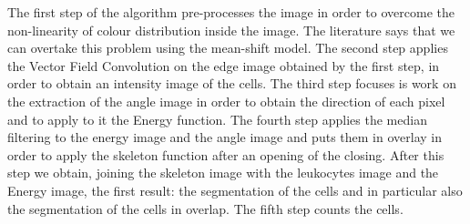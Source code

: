 The first step of the algorithm pre-processes the image in order to overcome the non-linearity  of colour distribution inside the image. The literature says that we can overtake this problem using the mean-shift model. The second step applies the Vector Field Convolution on the edge image obtained by the first step, in order to obtain an intensity image of the cells. The third step focuses is work on the extraction of the angle image in order to obtain the direction of each pixel and to apply to it the Energy function. The fourth step applies the median filtering to the energy image and the angle image and puts them in overlay in order to apply the skeleton function after an opening of the closing. After this step we obtain, joining the skeleton image with the leukocytes image and the Energy image, the first result: the segmentation of the cells and in particular also the segmentation of the cells in overlap.
The fifth step counts the cells.